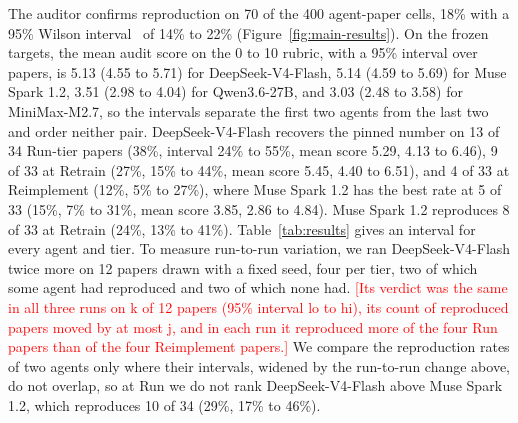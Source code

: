 \documentclass{article} %
\newcommand{\todo}[1]{\textcolor{red}{[#1]}}
\begin{document}
The auditor confirms reproduction on 70 of the 400 agent-paper cells, 18\% with
a 95\% Wilson interval~\citep{wilson1927probable} of 14\% to 22\%
(Figure~\ref{fig:main-results}). %
On the frozen targets, the mean audit score on the 0 to 10 rubric, with a 95\%
interval over papers, is 5.13 (4.55 to 5.71) for DeepSeek-V4-Flash, 5.14 (4.59
to 5.69) for Muse Spark 1.2, 3.51 (2.98 to 4.04) for Qwen3.6-27B, and 3.03
(2.48 to 3.58) for MiniMax-M2.7, so the intervals separate the first two agents
from the last two and order neither pair. %
DeepSeek-V4-Flash recovers the pinned number on 13 of 34 Run-tier papers (38\%, interval 24\%
to 55\%, mean score 5.29, 4.13 to 6.46), 9 of 33 at Retrain (27\%, 15\% to 44\%,
mean score 5.45, 4.40 to 6.51), and 4 of 33 at Reimplement
(12\%, 5\% to 27\%), where Muse Spark 1.2 has the best rate at 5 of 33 (15\%,
7\% to 31\%, mean score 3.85, 2.86 to 4.84). Muse Spark 1.2 reproduces 8 of 33 at Retrain (24\%, 13\% to 41\%).
Table~\ref{tab:results} gives an interval for every agent and tier.
To measure run-to-run variation, we ran DeepSeek-V4-Flash twice more on 12
papers drawn with a fixed seed, four per tier, two of which some agent had
reproduced and two of which none had. %
\todo{Its verdict was the same in all three runs on k of 12 papers (95\%
interval lo to hi), its count of reproduced papers moved by at most j, and in
each run it reproduced more of the four Run papers than of the four
Reimplement papers.}
We compare the reproduction rates of two agents only where their intervals,
widened by the run-to-run change above, do not overlap, so at Run we do not rank
DeepSeek-V4-Flash above Muse Spark 1.2, which reproduces 10 of 34 (29\%, 17\% to
46\%). %
\end{document}

